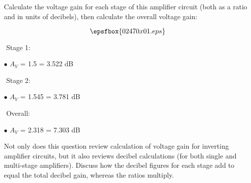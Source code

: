 

Calculate the voltage gain for each stage of this amplifier circuit (both as a ratio and in units of decibels), then calculate the overall voltage gain:

$$\epsfbox{02470x01.eps}$$







\medskip
\goodbreak
\item{$ $} Stage 1:
\item{$\bullet$} $A_V$ = 1.5 = 3.522 dB
\medskip

\medskip
\goodbreak
\item{$ $} Stage 2:
\item{$\bullet$} $A_V$ = 1.545 = 3.781 dB
\medskip

\medskip
\goodbreak
\item{$ $} Overall:
\item{$\bullet$} $A_V$ = 2.318 = 7.303 dB
\medskip







Not only does this question review calculation of voltage gain for inverting amplifier circuits, but it also reviews decibel calculations (for both single and multi-stage amplifiers).  Discuss how the decibel figures for each stage add to equal the total decibel gain, whereas the ratios multiply.




